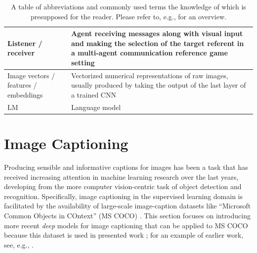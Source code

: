 \begin{table}[]
\begin{tabularx}{\textwidth}{|X|X|}
		Listener / receiver          & Agent receiving messages along with visual input and making the selection of the target referent \newline in a multi-agent communication reference game setting \\ \hline
		Image vectors / features / embeddings & Vectorized numerical representations of raw images, usually produced by taking the output of the last layer of a trained CNN \\ \hline
		LM 						& Language model \parencite{jurafsky2000speech} \\ \hline
	\end{tabularx}
\caption{\label{tab:defs}A table of abbreviations and commonly used terms the knowledge of which is presupposed for the reader. Please refer to, e.g., \cite{goodfellow2016deep} for an overview.}

\end{table}


\section{Image Captioning}
\label{image_captioning}
Producing sensible and informative captions for images has been a task that has received increasing attention in machine learning research over the last years, developing from the more computer vision-centric task of object detection and recognition. Specifically, image captioning in the supervised learning domain is facilitated by the availability of large-scale image-caption datasets like ``Microsoft Common Objects in COntext'' (MS COCO) \parencite{lin2014microsoft, chen2015microsoft}. %
This section focuses on introducing more recent \textit{deep} models for image captioning that can be applied to MS COCO because this dataset is used in presented work \parencite{lecun2015deep}; for an example of earlier work, see, e.g., \cite{kulkarni2013babytalk}.

